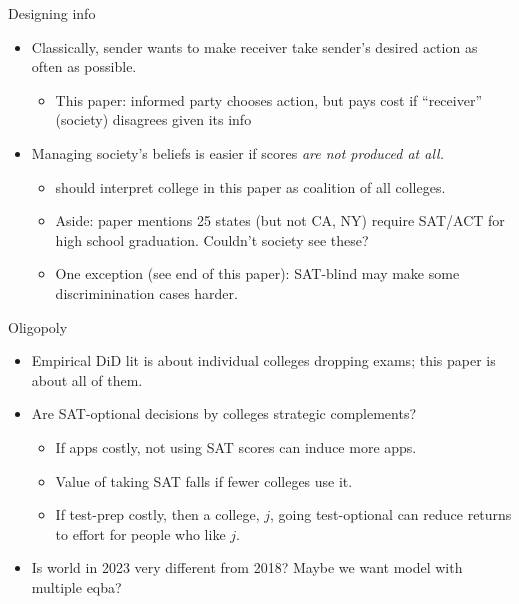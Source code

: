 \documentclass[11pt, aspectratio=169]{beamer}
\theoremstyle{plain}
\theoremstyle{plain}
\theoremstyle{plain}
\theoremstyle{plain}
\begin{document}
\begin{frame}{Designing info}
    \begin{itemize}
        \item Classically, sender wants to make receiver take sender's desired action as often as possible. \pause
        \begin{itemize}
            \item This paper: informed party chooses action, but pays cost if ``receiver'' (society) disagrees given its info \pause
        \end{itemize}

        \item Managing society's beliefs is easier if scores \emph{are not produced at all.} \pause
        \begin{itemize}
            \item should interpret college in this paper as coalition of all colleges. \pause %
            \item Aside: paper mentions 25 states (but not CA, NY) require SAT/ACT for high school graduation.  Couldn't society see these? \pause
            \item One exception (see end of this paper): SAT-blind may make some discriminination cases harder.
        \end{itemize}  
    \end{itemize}
\end{frame}

\begin{frame}{Oligopoly}
\begin{itemize}
    \item Empirical DiD lit is about individual colleges dropping exams; this paper is about all of them.
    \item Are SAT-optional decisions by colleges strategic complements?
    \begin{itemize}
        \item If apps costly, not using SAT scores can induce more apps.
        \item Value of taking SAT falls if fewer colleges use it.
        \item If test-prep costly, then a college, $j$, going test-optional can reduce returns to effort for people who like $j$.
    \end{itemize}
    \item Is world in 2023 very different from 2018? Maybe we want model with multiple eqba? \pause
\end{itemize}
\end{frame}
\end{document}
